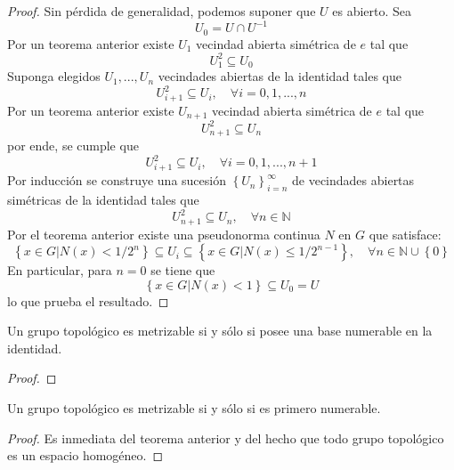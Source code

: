 \documentclass[12pt]{report}
\theoremstyle{largebreak}
\begin{document}
    \begin{proof}
        Sin pérdida de generalidad, podemos suponer que $U$ es abierto. Sea
        \begin{equation*}
            U_0=U\cap U^{ -1} 
        \end{equation*}
        Por un teorema anterior existe $U_1$ vecindad abierta simétrica de $e$ tal que
        \begin{equation*}
            U_1^2\subseteq U_0
        \end{equation*}
        Suponga elegidos $U_1,...,U_n$ vecindades abiertas de la identidad tales que
        \begin{equation*}
            U_{ i+1}^2\subseteq U_i,\quad\forall i=0,1,...,n
        \end{equation*}
        Por un teorema anterior existe $U_{ n+1}$ vecindad abierta simétrica de $e$ tal que
        \begin{equation*}
            U_{ n+1}^2\subseteq U_n
        \end{equation*}
        por ende, se cumple que
        \begin{equation*}
            U_{ i+1}^2\subseteq U_i,\quad\forall i=0,1,...,n+1
        \end{equation*}
        Por inducción se construye una sucesión $\left\{U_n \right\}_{ i=n}^\infty$ de vecindades abiertas simétricas de la identidad tales que
        \begin{equation*}
            U_{ n+1}^2\subseteq U_n,\quad\forall n\in\mathbb{N}
        \end{equation*}
        Por el teorema anterior existe una pseudonorma continua $N$ en $G$ que satisface:
        \begin{equation*}
            \left\{x\in G\Big|N(x)<1/2^n \right\}\subseteq U_i\subseteq\left\{x\in G\Big| N(x)\leq 1/2^{ n-1} \right\},\quad\forall n\in\mathbb{N}\cup\left\{0\right\}
        \end{equation*}
        En particular, para $n=0$ se tiene que
        \begin{equation*}
            \left\{x\in G\Big| N(x)<1 \right\}\subseteq U_0=U
        \end{equation*}
        lo que prueba el resultado.
    \end{proof}

    \begin{theor}
        Un grupo topológico es metrizable si y sólo si posee una base numerable en la identidad.
    \end{theor}

    \begin{proof}
        
    \end{proof}

    \begin{cor}
        Un grupo topológico es metrizable si y sólo si es primero numerable.
    \end{cor}

    \begin{proof}
        Es inmediata del teorema anterior y del hecho que todo grupo topológico es un espacio homogéneo.
    \end{proof}
\end{document}
